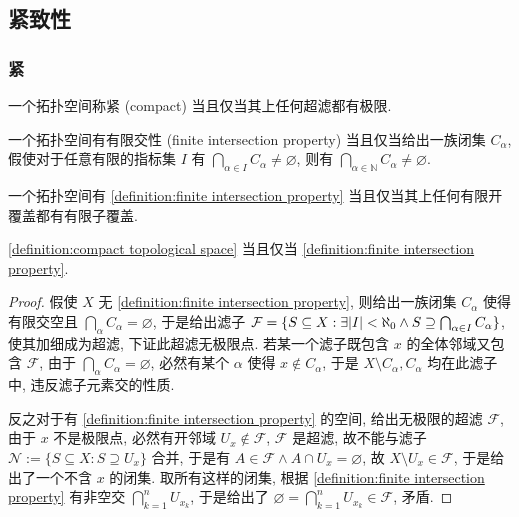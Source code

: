 \subsection{紧致性}

\subsubsection{紧}

\begin{definition}[紧]
    \label {definition:compact topological space}
    一个拓扑空间称紧 (compact) 当且仅当其上任何超滤都有极限.
\end{definition}

\begin{definition}[有限交性]
    \label {definition:finite intersection property}
    一个拓扑空间有有限交性 (finite intersection property) 当且仅当给出一族闭集 \(C_\alpha\),
    假使对于任意有限的指标集 \(I\) 有 \(\bigcap_{\alpha \in I} C_\alpha \neq \varnothing\), 则有 \(\bigcap_{\alpha \in \mathbb{N}} C_\alpha \neq \varnothing\).
\end{definition}

\begin{corollary}
    一个拓扑空间有 \ref{definition:finite intersection property} 当且仅当其上任何有限开覆盖都有有限子覆盖.
\end{corollary}

\begin{lemma}
    \ref{definition:compact topological space} 当且仅当 \ref{definition:finite intersection property}.

    \begin{proof}
        假使 \(X\) 无 \ref{definition:finite intersection property}, 则给出一族闭集 \(C_\alpha\) 使得有限交空且
        \(\bigcap_{\alpha} C_\alpha = \varnothing\), 于是给出滤子 \(\mathcal{F} = \{S \subseteq X : \exists \abs{I} < \aleph_0 \land S \supseteq \bigcap_{\alpha \in I} C_\alpha\}\),
        使其加细成为超滤, 下证此超滤无极限点. 若某一个滤子既包含 \(x\) 的全体邻域又包含 \(\mathcal{F}\), 由于 \(\bigcap_\alpha C_\alpha = \varnothing\),
        必然有某个 \(\alpha\) 使得 \(x \notin C_\alpha\), 于是 \(X \setminus C_\alpha, C_\alpha\) 均在此滤子中, 违反滤子元素交的性质.

        反之对于有 \ref{definition:finite intersection property} 的空间, 给出无极限的超滤 \(\mathcal{F}\),
        由于 \(x\) 不是极限点, 必然有开邻域 \(U_x \notin \mathcal{F}\), \(\mathcal{F}\) 是超滤, 故不能与滤子 \(\mathcal{N} := \{S \subseteq X : S \supseteq U_x\}\) 合并, 
        于是有 \(A \in \mathcal{F} \land A \cap U_x = \varnothing\), 故 \(X \setminus U_x \in \mathcal{F}\), 于是给出了一个不含 \(x\) 的闭集. 取所有这样的闭集,
        根据 \ref{definition:finite intersection property} 有非空交 \(\bigcap_{k = 1}^n U_{x_k}\), 于是给出了 \(\varnothing = \bigcap_{k = 1}^n U_{x_k} \in \mathcal{F}\),
        矛盾.
    \end{proof}
\end{lemma}

